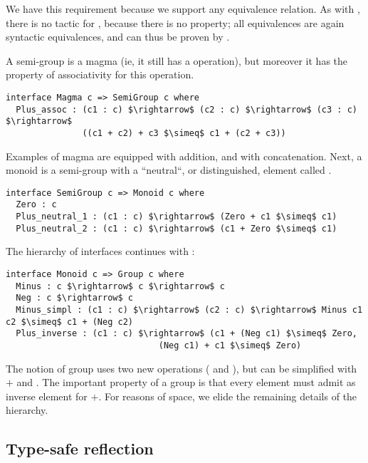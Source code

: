 We have this requirement because we support
any equivalence relation.
As with , there is no
tactic for , because there is no property; all
equivalences are again syntactic equivalences, and can thus be proven by
. 

A semi-group is a magma (ie, it still has a  operation), but moreover it has the property of associativity for this operation. 

\begin{lstlisting}
interface Magma c => SemiGroup c where
  Plus_assoc : (c1 : c) $\rightarrow$ (c2 : c) $\rightarrow$ (c3 : c) $\rightarrow$ 
               ((c1 + c2) + c3 $\simeq$ c1 + (c2 + c3))
\end{lstlisting}

\noindent
Examples of magma are  equipped with addition, and  with
concatenation.  Next, a monoid is a semi-group with a ``neutral``, or
distinguished, element called .

\begin{lstlisting}
interface SemiGroup c => Monoid c where
  Zero : c    
  Plus_neutral_1 : (c1 : c) $\rightarrow$ (Zero + c1 $\simeq$ c1)    
  Plus_neutral_2 : (c1 : c) $\rightarrow$ (c1 + Zero $\simeq$ c1)
\end{lstlisting}

\noindent
The hierarchy of interfaces continues with :

\begin{lstlisting}
interface Monoid c => Group c where
  Minus : c $\rightarrow$ c $\rightarrow$ c
  Neg : c $\rightarrow$ c
  Minus_simpl : (c1 : c) $\rightarrow$ (c2 : c) $\rightarrow$ Minus c1 c2 $\simeq$ c1 + (Neg c2) 
  Plus_inverse : (c1 : c) $\rightarrow$ (c1 + (Neg c1) $\simeq$ Zero, 
                              (Neg c1) + c1 $\simeq$ Zero)
\end{lstlisting}

The notion of group uses two new operations ( and ), but
 can be simplified with $+$ and .
The important property of a group is that every element  must admit
 as inverse element for $+$.
For reasons of space, we elide the remaining details of the hierarchy.

\subsection{Type-safe reflection}
\label{sect:typeSafeReflection}
			
